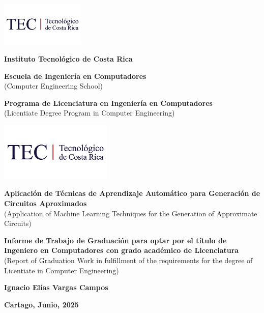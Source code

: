 \begin{titlepage}
  \raggedright
  \addtolength{\topmargin}{-1cm}
  \includegraphics[width = 40mm]{imágenes/logo tec.png}

  \begin{center}
    \vspace*{1cm}

    {\large\textbf{Instituto Tecnológico de Costa Rica}}

    \vspace{0.3cm}

    {\large\textbf{Escuela de Ingeniería en Computadores}}\\
    {\small{(Computer Engineering School)}}

    \vspace{0.3cm}

    {\large\textbf{Programa de Licenciatura en Ingeniería en Computadores}}\\
    {\small{(Licentiate Degree Program in Computer Engineering)}}

    \vspace{0.5cm}

    \includegraphics[width=0.4\textwidth]{imágenes/logo tec.png}
    \vspace{1cm}

    {\large\textbf{Aplicación de Técnicas de Aprendizaje Automático para Generación de Circuitos Aproximados
    }}\\
    {\small{(Application of Machine Learning Techniques for the Generation of Approximate Circuits)}}

    \vspace{2cm}

    {\large\textbf{Informe de Trabajo de Graduación para optar por el título de Ingeniero en Computadores con grado académico de Licenciatura}}\\
    {\small{(Report of Graduation Work in fulfillment of the requirements for the degree of Licentiate in Computer Engineering)}}

    \vspace{3cm}

    {\large\textbf{Ignacio Elías Vargas Campos}}

    \vfill

    {\large\textbf{
        Cartago, Junio, 2025
    }}
  \end{center}
\end{titlepage}
